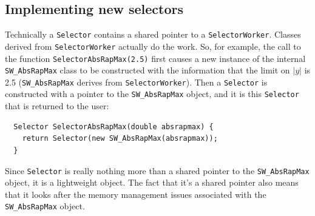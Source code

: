 \documentclass[12pt,a4]{article}
\newcommand{\fastjet}{\texttt{FastJet}\xspace}
\newcommand{\ttt}[1]{{\small\texttt{#1}}}
\newcommand{\ee}{e^+e^-}
\begin{document}




\subsection{Implementing new selectors}
\label{sec:new-selectors}

Technically a \ttt{Selector} contains a shared pointer to a
\ttt{SelectorWorker}.
%
Classes derived from \ttt{SelectorWorker} actually do the work. 
%
So, for example, the call to the function \ttt{SelectorAbsRapMax(2.5)}
first causes a new instance of the internal \ttt{SW\_AbsRapMax} class
to be constructed with the information that the limit on $|y|$
is 2.5 (\ttt{SW\_AbsRapMax} derives from \ttt{SelectorWorker}).
%
Then a \ttt{Selector} is constructed with a pointer to the
\ttt{SW\_AbsRapMax} object, and it is this \ttt{Selector} that is
returned to the user:
%
\begin{lstlisting}
  Selector SelectorAbsRapMax(double absrapmax) {
    return Selector(new SW_AbsRapMax(absrapmax));
  }
\end{lstlisting}
%
Since \ttt{Selector} is really nothing more than a shared pointer to
the \ttt{SW\_AbsRapMax} object, it is a lightweight object. 
%
The fact that it's a shared pointer also means that it looks after
the memory management issues associated with the \ttt{SW\_AbsRapMax}
object. 
\end{document}
